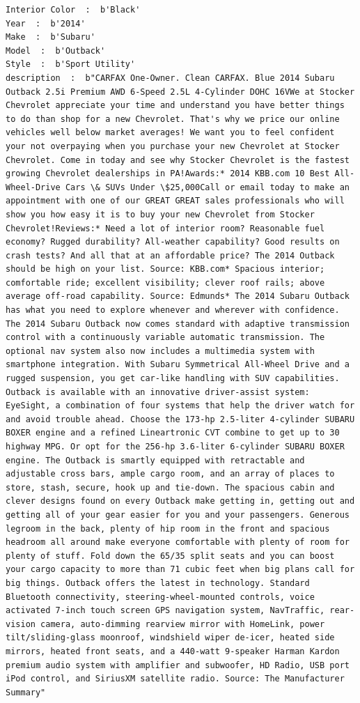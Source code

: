\documentclass[11pt]{article}
\begin{document}
    \begin{Verbatim}[commandchars=\\\{\}]
Interior Color  :  b'Black'
Year  :  b'2014'
Make  :  b'Subaru'
Model  :  b'Outback'
Style  :  b'Sport Utility'
description  :  b"CARFAX One-Owner. Clean CARFAX. Blue 2014 Subaru Outback 2.5i Premium AWD 6-Speed 2.5L 4-Cylinder DOHC 16VWe at Stocker Chevrolet appreciate your time and understand you have better things to do than shop for a new Chevrolet. That's why we price our online vehicles well below market averages! We want you to feel confident your not overpaying when you purchase your new Chevrolet at Stocker Chevrolet. Come in today and see why Stocker Chevrolet is the fastest growing Chevrolet dealerships in PA!Awards:* 2014 KBB.com 10 Best All-Wheel-Drive Cars \& SUVs Under \$25,000Call or email today to make an appointment with one of our GREAT GREAT sales professionals who will show you how easy it is to buy your new Chevrolet from Stocker Chevrolet!Reviews:* Need a lot of interior room? Reasonable fuel economy? Rugged durability? All-weather capability? Good results on crash tests? And all that at an affordable price? The 2014 Outback should be high on your list. Source: KBB.com* Spacious interior; comfortable ride; excellent visibility; clever roof rails; above average off-road capability. Source: Edmunds* The 2014 Subaru Outback has what you need to explore whenever and wherever with confidence. The 2014 Subaru Outback now comes standard with adaptive transmission control with a continuously variable automatic transmission. The optional nav system also now includes a multimedia system with smartphone integration. With Subaru Symmetrical All-Wheel Drive and a rugged suspension, you get car-like handling with SUV capabilities. Outback is available with an innovative driver-assist system: EyeSight, a combination of four systems that help the driver watch for and avoid trouble ahead. Choose the 173-hp 2.5-liter 4-cylinder SUBARU BOXER engine and a refined Lineartronic CVT combine to get up to 30 highway MPG. Or opt for the 256-hp 3.6-liter 6-cylinder SUBARU BOXER engine. The Outback is smartly equipped with retractable and adjustable cross bars, ample cargo room, and an array of places to store, stash, secure, hook up and tie-down. The spacious cabin and clever designs found on every Outback make getting in, getting out and getting all of your gear easier for you and your passengers. Generous legroom in the back, plenty of hip room in the front and spacious headroom all around make everyone comfortable with plenty of room for plenty of stuff. Fold down the 65/35 split seats and you can boost your cargo capacity to more than 71 cubic feet when big plans call for big things. Outback offers the latest in technology. Standard Bluetooth connectivity, steering-wheel-mounted controls, voice activated 7-inch touch screen GPS navigation system, NavTraffic, rear-vision camera, auto-dimming rearview mirror with HomeLink, power tilt/sliding-glass moonroof, windshield wiper de-icer, heated side mirrors, heated front seats, and a 440-watt 9-speaker Harman Kardon premium audio system with amplifier and subwoofer, HD Radio, USB port iPod control, and SiriusXM satellite radio. Source: The Manufacturer Summary"

\end{Verbatim}
\end{document}
